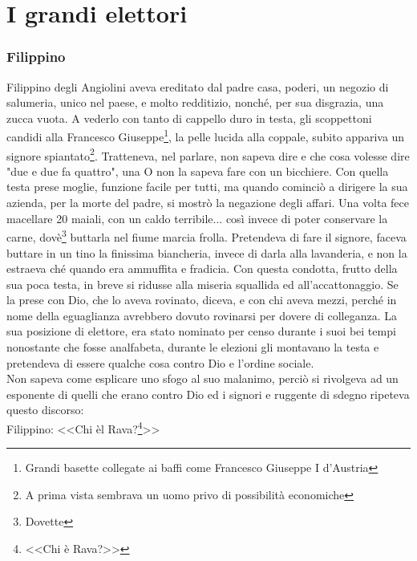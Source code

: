 
\chapter{I grandi elettori}
\subsection{Filippino}
Filippino degli Angiolini aveva ereditato dal padre casa, poderi, un negozio di salumeria, unico nel paese, e molto redditizio, nonché, per sua disgrazia, una zucca vuota. A vederlo con tanto di cappello duro in testa, gli scoppettoni candidi alla Francesco Giuseppe\footnote{Grandi basette collegate ai baffi come Francesco Giuseppe I d'Austria}, la pelle lucida alla coppale, subito appariva un signore spiantato\footnote{A prima vista sembrava un uomo privo di possibilità economiche}. Tratteneva, nel parlare, non sapeva dire e che cosa volesse dire "due e due fa quattro", una O non la sapeva fare con un bicchiere. Con quella testa prese moglie, funzione facile per tutti, ma quando cominciò a dirigere la sua azienda, per la morte del padre, si mostrò la negazione degli affari. Una volta fece macellare 20 maiali, con un caldo terribile... così invece di poter conservare la carne, dovè\footnote{Dovette} buttarla nel fiume marcia frolla. Pretendeva di fare il signore, faceva buttare in un tino la finissima biancheria, invece di darla alla lavanderia, e non la estraeva ché quando era ammuffita e fradicia. Con questa condotta, frutto della sua poca testa, in breve si ridusse alla miseria squallida ed all'accattonaggio. Se la prese con Dio, che lo aveva rovinato, diceva, e con chi aveva mezzi, perché in nome della eguaglianza avrebbero dovuto rovinarsi per dovere di colleganza. La sua posizione di elettore, era stato nominato per censo durante i suoi bei tempi nonostante che fosse analfabeta, durante le elezioni gli montavano la testa e pretendeva di essere qualche cosa contro Dio e l'ordine sociale. \\
\indent Non sapeva come esplicare uno sfogo al suo malanimo, perciò si rivolgeva ad un esponente di quelli che erano contro Dio ed i signori e ruggente di sdegno ripeteva questo discorso:\\
\indent {}Filippino: <<Chi èl Rava?\footnote{<<Chi è Rava?>>}>>\\
